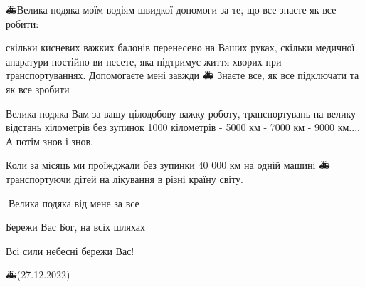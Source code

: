 🚑Велика подяка моїм водіям швидкої допомоги за те, що все знаєте як все
робити: 

скільки кисневих важких балонів перенесено на Ваших руках, скільки медичної
апаратури постійно ви несете,  яка підтримує життя хворих при транспортуваннях.
Допомогаєте мені завжди 🚑 Знаєте все, як все підключати та як все зробити🏥

Велика подяка Вам за вашу цілодобову важку роботу, транспортувань на велику
відстань кілометрів без зупинок 1000 кілометрів - 5000 км - 7000 км - 9000
км.... А потім знов і знов. 

Коли за місяць ми проїжджали без зупинки 40 000 км на одній машині 🚑
транспортуючи дітей на лікування в різні країну світу. 

🙏Велика подяка від мене за все🙏

Бережи Вас Бог, на всіх шляхах🙏

Всі сили небесні бережи Вас!🙏

🚑(27.12.2022)
